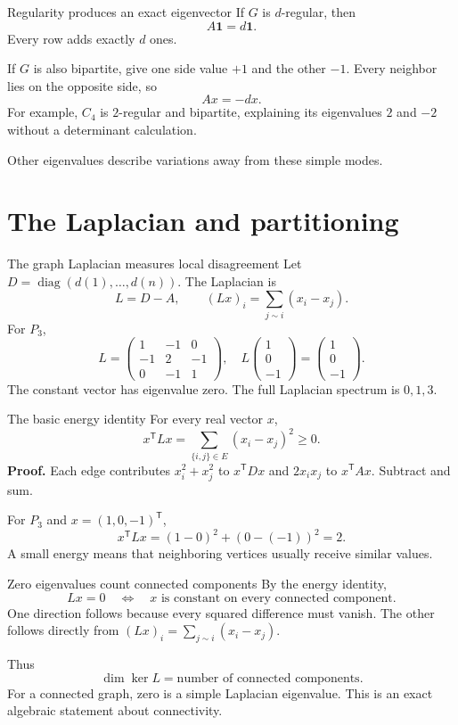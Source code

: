\documentclass[aspectratio=169,11pt]{beamer}
\newcommand{\one}{\mathbf 1}
\begin{document}
\begin{frame}{Regularity produces an exact eigenvector}
If $G$ is $d$-regular, then
\[
 A\one=d\one.
\]
Every row adds exactly $d$ ones.

If $G$ is also bipartite, give one side value $+1$ and the other $-1$.
Every neighbor lies on the opposite side, so
\[
 Ax=-dx.
\]
For example, $C_4$ is $2$-regular and bipartite, explaining its eigenvalues
$2$ and $-2$ without a determinant calculation.

Other eigenvalues describe variations away from these simple modes.
\end{frame}

\section{The Laplacian and partitioning}
\begin{frame}{The graph Laplacian measures local disagreement}
Let $D=\operatorname{diag}(d(1),\ldots,d(n))$. The Laplacian is
\[
 L=D-A,\qquad (Lx)_i=\sum_{j\sim i}(x_i-x_j).
\]
For $P_3$,
\[
 L=\begin{pmatrix}1&-1&0\\-1&2&-1\\0&-1&1\end{pmatrix},\quad
 L\begin{pmatrix}1\\0\\-1\end{pmatrix}
 =\begin{pmatrix}1\\0\\-1\end{pmatrix}.
\]
The constant vector has eigenvalue zero. The full Laplacian spectrum is
$0,1,3$.
\end{frame}

\begin{frame}{The basic energy identity}
For every real vector $x$,
\[
 x^{\mathsf T}Lx=\sum_{\{i,j\}\in E}(x_i-x_j)^2\ge0.
\]
\textbf{Proof.} Each edge contributes $x_i^2+x_j^2$ to
$x^{\mathsf T}Dx$ and $2x_ix_j$ to $x^{\mathsf T}Ax$.
Subtract and sum.

For $P_3$ and $x=(1,0,-1)^{\mathsf T}$,
\[
 x^{\mathsf T}Lx=(1-0)^2+(0-(-1))^2=2.
\]
A small energy means that neighboring vertices usually receive similar
values.
\end{frame}

\begin{frame}{Zero eigenvalues count connected components}
By the energy identity,
\[
 Lx=0\quad\Longleftrightarrow\quad
 x\text{ is constant on every connected component}.
\]
One direction follows because every squared difference must vanish.
The other follows directly from $(Lx)_i=\sum_{j\sim i}(x_i-x_j)$.

Thus
\[
 \dim\ker L=\text{number of connected components}.
\]
For a connected graph, zero is a simple Laplacian eigenvalue.
This is an exact algebraic statement about connectivity.
\end{frame}
\end{document}
